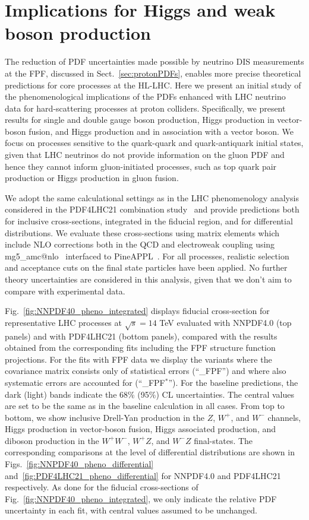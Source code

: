 \section{Implications for Higgs and weak boson production}
\label{sec:pheno}

The reduction of PDF uncertainties made possible by neutrino DIS measurements
at the FPF, discussed in Sect.~\ref{sec:protonPDFs},
enables more precise theoretical predictions for core processes at the
HL-LHC.
%
Here we present an initial study of the phenomenological implications
of the PDFs enhanced with LHC neutrino data
for hard-scattering processes at proton colliders.
%
Specifically, we present results for 
single and double gauge boson production,  Higgs production in
vector-boson fusion, and Higgs production and in association with a vector boson.
%
We focus on processes sensitive to the quark-quark and quark-antiquark initial
states, given that LHC neutrinos do not provide information on the gluon
PDF and hence they cannot inform  gluon-initiated
processes, such as top quark pair production or Higgs production in gluon fusion.

We adopt the same calculational settings as in the LHC phenomenology analysis considered
in the PDF4LHC21 combination study~\cite{PDF4LHCWorkingGroup:2022cjn} and provide predictions
both for inclusive cross-sections, integrated in the fiducial
region, and for differential distributions.
%
We evaluate these cross-sections using matrix elements
which include NLO corrections both in the
QCD and electroweak coupling using
{\sc\small mg5\_amc@nlo}~\cite{Frederix:2018nkq}
interfaced to {\sc\small PineAPPL}~\cite{Carrazza:2020gss}.
%
For all processes, realistic selection and acceptance cuts on the final state particles
have been applied.
%
No further theory uncertainties are considered in this
analysis, given that we don't aim to compare with experimental data.

Fig.~\ref{fig:NNPDF40_pheno_integrated} displays
fiducial cross-section for representative LHC processes at $\sqrt{s}=14$ TeV
evaluated with NNPDF4.0 (top panels)
and with PDF4LHC21 (bottom panels),
compared with the results obtained from
the corresponding fits including the FPF structure function projections.
%
For the fits with FPF data we display the variants where the covariance matrix
consists only of statistical errors (``\_FPF'') and where also
systematic errors are accounted for (``\_FPF$^*$'').
%
For the baseline
predictions, the dark (light) bands indicate the 68\% (95\%) CL uncertainties.
%
The central values are set to be the same as in the baseline calculation in all cases.
%
From top to bottom, we show inclusive Drell-Yan production in the $Z$, $W^+$, and $W^-$
channels, Higgs production
in vector-boson fusion, Higgs associated
production, and diboson production in the $W^+W^-$, $W^+Z$, and $W^-Z$ final-states.
%
The corresponding comparisons at the level of differential distributions
are shown in Figs.~\ref{fig:NNPDF40_pheno_differential} and~\ref{fig:PDF4LHC21_pheno_differential}
for NNPDF4.0 and PDF4LHC21 respectively.
%
As done for the fiducial cross-sections of Fig.~\ref{fig:NNPDF40_pheno_integrated},
we only indicate the relative PDF uncertainty in each fit, with central values
assumed to be unchanged.

